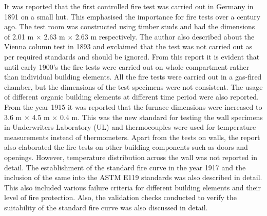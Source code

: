 It was reported that the first controlled fire test was carried out in Germany in 1891 on a small hut. This emphasised the importance for fire tests over a century ago. The test room was constructed using timber studs and had the dimensions of 2.01 m $\times$ 2.63 m $\times$ 2.63 m respectively. The author also described about the Vienna column test in 1893 and exclaimed that the test was not carried out as per required standards and should be ignored. From this report it is evident that until early 1900's the fire tests were carried out on whole compartment rather than individual building elements. All the fire tests were carried out in a gas-fired chamber, but the dimensions of the test specimens were not consistent. The usage of different organic building elements at different time period were also reported. From the year 1915 it was reported that the furnace dimensions were increased to 3.6 m $\times$ 4.5 m $\times$ 0.4 m. This was the new standard for testing the wall specimens in Underwriters Laboratory (UL) and thermocouples were used for temperature measurements instead of thermometers. Apart from the tests on walls, the report also elaborated the fire tests on other building components such as doors and openings. However, temperature distribution across the wall was not reported in detail. The establishment of the standard fire curve in the year 1917 and the inclusion of the same into the ASTM E119 standards was also described in detail. This also included various failure criteria for different building elements and their level of fire protection. Also, the validation checks conducted to verify the suitability of the standard fire curve was also discussed in detail.

